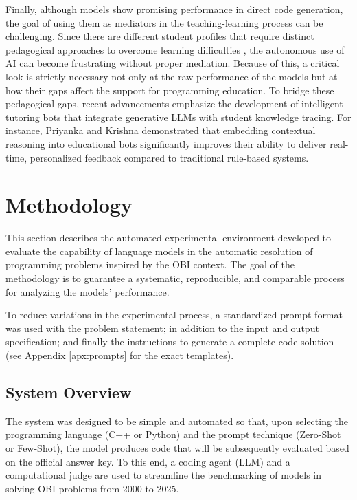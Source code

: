 \documentclass[conference]{IEEEtran}
\begin{document}
Finally, although models show promising performance in direct code generation, the goal of using them as mediators in the teaching-learning process can be challenging. Since there are different student profiles that require distinct pedagogical approaches to overcome learning difficulties \cite{baist2017analysis}, the autonomous use of AI can become frustrating without proper mediation. Because of this, a critical look is strictly necessary not only at the raw performance of the models but at how their gaps affect the support for programming education. To bridge these pedagogical gaps, recent advancements emphasize the development of intelligent tutoring bots that integrate generative LLMs with student knowledge tracing. For instance, Priyanka and Krishna \cite{priyanka2025development} demonstrated that embedding contextual reasoning into educational bots significantly improves their ability to deliver real-time, personalized feedback compared to traditional rule-based systems.

\section{Methodology}\label{sec:methodology}

This section describes the automated experimental environment developed to evaluate the capability of language models in the automatic resolution of programming problems inspired by the OBI context. The goal of the methodology is to guarantee a systematic, reproducible, and comparable process for analyzing the models' performance.

To reduce variations in the experimental process, a standardized prompt format was used with the problem statement; in addition to the input and output specification; and finally the instructions to generate a complete code solution (see Appendix \ref{apx:prompts} for the exact templates).

\subsection{System Overview}\label{subsec:system}

The system was designed to be simple and automated so that, upon selecting the programming language (C++ or Python) and the prompt technique (Zero-Shot or Few-Shot), the model produces code that will be subsequently evaluated based on the official answer key. To this end, a coding agent (LLM) and a computational judge are used to streamline the benchmarking of models in solving OBI problems from 2000 to 2025.
\end{document}

